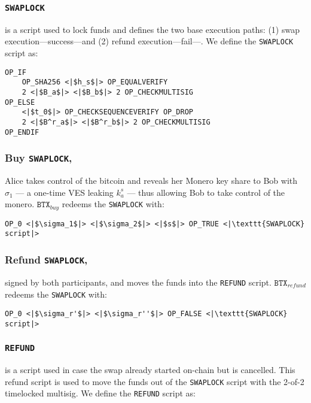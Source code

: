 \documentclass{llncs}
\newcommand{\BTX}{\texttt{BTX}}
\begin{document}
\subsubsection{\texttt{SWAPLOCK}}
is a script used to lock funds and defines the two base execution paths: (1) swap execution---success---and (2) refund execution---fail---. We define the \texttt{SWAPLOCK} script as:

\begin{verbatim}
OP_IF
    OP_SHA256 <|$h_s$|> OP_EQUALVERIFY
    2 <|$B_a$|> <|$B_b$|> 2 OP_CHECKMULTISIG
OP_ELSE
    <|$t_0$|> OP_CHECKSEQUENCEVERIFY OP_DROP
    2 <|$B^r_a$|> <|$B^r_b$|> 2 OP_CHECKMULTISIG
OP_ENDIF
\end{verbatim}

\subsubsection{Buy \texttt{SWAPLOCK},}
Alice takes control of the bitcoin and reveals her Monero key share to Bob with $\sigma_1$ --- a one-time VES leaking $k^s_a$ --- thus allowing Bob to take control of the monero. $\BTX_\textit{buy}$ redeems the \texttt{SWAPLOCK} with:

\begin{verbatim}
OP_0 <|$\sigma_1$|> <|$\sigma_2$|> <|$s$|> OP_TRUE <|\texttt{SWAPLOCK} script|>
\end{verbatim}

\subsubsection{Refund \texttt{SWAPLOCK},}
signed by both participants, and moves the funds into the \texttt{REFUND} script. $\BTX_\textit{refund}$ redeems the \texttt{SWAPLOCK} with:

\begin{verbatim}
OP_0 <|$\sigma_r'$|> <|$\sigma_r''$|> OP_FALSE <|\texttt{SWAPLOCK} script|>
\end{verbatim}

\subsubsection{\texttt{REFUND}}
is a script used in case the swap already started on-chain but is cancelled. This refund script is used to move the funds out of the \texttt{SWAPLOCK} script with the 2-of-2 timelocked multisig. We define the \texttt{REFUND} script as:
\end{document}
